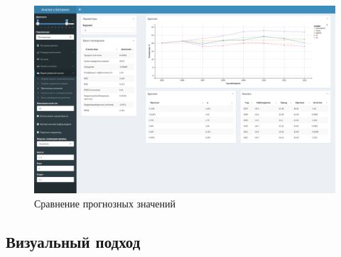 \documentclass[notheorems]{beamer}
\theoremstyle{definition}
\theoremstyle{example}
\theoremstyle{plain}
\begin{document}
\begin{frame}
  \frametitle{\large\secname}
  \framesubtitle{\subsecname}
    \begin{figure}[h]
    \includegraphics[width=1\textwidth]{../../figures/static/6_krige.png}
    \caption{Сравнение прогнозных значений}
  \end{figure}
\end{frame}

\subsection{Визуальный подход}%
\end{document}
